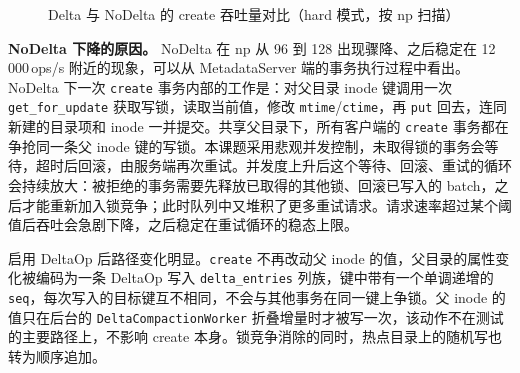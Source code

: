 \begin{figure}[htbp]
    \centering
    \caption{Delta 与 NoDelta 的 create 吞吐量对比（hard 模式，按 $\mathrm{np}$ 扫描）}
    \label{fig:delta-nodelta-curve}
\end{figure}

\textbf{NoDelta 下降的原因。} NoDelta 在 $\mathrm{np}$ 从 96 到 128 出现骤降、之后稳定在 12\,000\,ops/s 附近的现象，可以从 MetadataServer 端的事务执行过程中看出。NoDelta 下一次 \texttt{create} 事务内部的工作是：对父目录 inode 键调用一次 \texttt{get\_for\_update} 获取写锁，读取当前值，修改 \texttt{mtime}/\texttt{ctime}，再 \texttt{put} 回去，连同新建的目录项和 inode 一并提交。共享父目录下，所有客户端的 \texttt{create} 事务都在争抢同一条父 inode 键的写锁。本课题采用悲观并发控制，未取得锁的事务会等待，超时后回滚，由服务端再次重试。并发度上升后这个等待、回滚、重试的循环会持续放大：被拒绝的事务需要先释放已取得的其他锁、回滚已写入的 batch，之后才能重新加入锁竞争；此时队列中又堆积了更多重试请求。请求速率超过某个阈值后吞吐会急剧下降，之后稳定在重试循环的稳态上限。

启用 DeltaOp 后路径变化明显。\texttt{create} 不再改动父 inode 的值，父目录的属性变化被编码为一条 DeltaOp 写入 \texttt{delta\_entries} 列族，键中带有一个单调递增的 \texttt{seq}，每次写入的目标键互不相同，不会与其他事务在同一键上争锁。父 inode 的值只在后台的 \texttt{DeltaCompactionWorker} 折叠增量时才被写一次，该动作不在测试的主要路径上，不影响 create 本身。锁竞争消除的同时，热点目录上的随机写也转为顺序追加。

